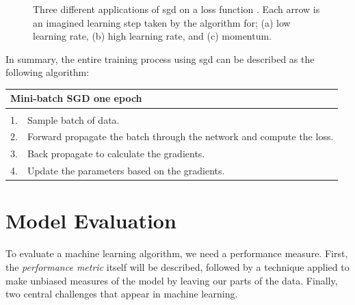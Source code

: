     \begin{figure}[H]
        \centering

        
        \caption[Learning rates]{Three different applications of \gls{sgd} on a loss function . Each arrow is an imagined learning step taken by the algorithm for; (a) low learning rate, (b) high learning rate, and (c) momentum.}
      	\medskip 
        \label{learning_rates}
    \end{figure}

    In summary, the entire training process using \gls{sgd} can be described as the following algorithm\cite{farsal2018deep}:
    
    \begin{longtable}{lllllll} \label{sgd algorithm}\\
    \hline
    \multicolumn{7}{l}{Mini-batch SGD one epoch}                                                              \\ \hline
    \endfirsthead
    \endhead
    \hline
    \endfoot
    \endlastfoot
    \multicolumn{7}{l}{Loop:}                                                                       \\
    1.   & \multicolumn{6}{l}{Sample batch of data.}                                                \\
    2.   & \multicolumn{6}{l}{Forward propagate the batch through the network and compute the loss.} \\
    3.   & \multicolumn{6}{l}{Back propagate to calculate the gradients.}                            \\
    4.   & \multicolumn{6}{l}{Update the parameters based on the gradients.}                         \\ \hline
    \end{longtable}
    
    

\section{Model Evaluation}
    To evaluate a machine learning algorithm, we need a performance measure. First, the \textit{performance metric} itself will be described, followed by a technique applied to make unbiased measures of the model by leaving our parts of the data. Finally, two central challenges that appear in machine learning.
    
